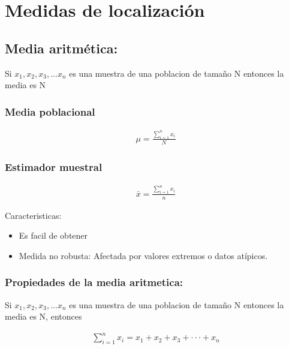 \documentclass[twocolumn]{article}
\providecommand{\tightlist}{%
  \setlength{\itemsep}{0pt}\setlength{\parskip}{0pt}}
\begin{document}
\section{Medidas de localización}\label{medidas-de-localizaciuxf3n}

\subsection{Media aritmética:}\label{media-aritmuxe9tica}

Si \(x_1, x_2, x_3,...x_n\) es una muestra de una poblacion de tamaño N
entonces la media es N

\subsubsection{Media poblacional}\label{media-poblacional}

\begin{align}
\mu = \frac{\sum_{i=1}^n x_i}{N}
\end{align}

\subsubsection{Estimador muestral}\label{estimador-muestral}

\begin{align}
\bar{x} = \frac{\sum_{i=1}^n x_i}{n}
\end{align}

Caracteristicas:

\begin{itemize}
\tightlist
\item
  Es facil de obtener
\item
  Medida no robusta: Afectada por valores extremos o datos atípicos.
\end{itemize}

\subsubsection{Propiedades de la media
aritmetica:}\label{propiedades-de-la-media-aritmetica}

Si \(x_1, x_2, x_3,...x_n\) es una muestra de una poblacion de tamaño N
entonces la media es N, entonces

\begin{align}
\sum_{i=1}^n x_i = x_1 + x_2 + x_3 + \cdot \cdot \cdot + x_n
\end{align}
\end{document}
